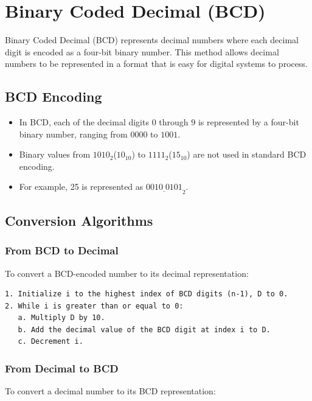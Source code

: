 \documentclass[12pt,openany]{book}
\begin{document}
	
	\section{Binary Coded Decimal (BCD)}
	
	Binary Coded Decimal (BCD) represents decimal numbers where each decimal digit is encoded as a four-bit binary number. This method allows decimal numbers to be represented in a format that is easy for digital systems to process.
	
	\subsection{BCD Encoding}
	
	\begin{itemize}
		\item In BCD, each of the decimal digits \(0\) through \(9\) is represented by a four-bit binary number, ranging from \(0000\) to \(1001\).
		\item Binary values from \(1010_2\)($10_{10}$) to \(1111_{2}\)($15_{10}$) are not used in standard BCD encoding.
		\item For example, 25 is represented as \(\underline{{0010 \; 0101}}_{2}\).
	\end{itemize}
	
	\subsection{Conversion Algorithms}
	
	\subsubsection{From BCD to Decimal}
	
	To convert a BCD-encoded number to its decimal representation:
	
	\begin{verbatim}
1. Initialize i to the highest index of BCD digits (n-1), D to 0.
2. While i is greater than or equal to 0:
   a. Multiply D by 10.
   b. Add the decimal value of the BCD digit at index i to D.
   c. Decrement i.
	\end{verbatim}
	
	\subsubsection{From Decimal to BCD}
	
	To convert a decimal number to its BCD representation:
	
\end{document}
